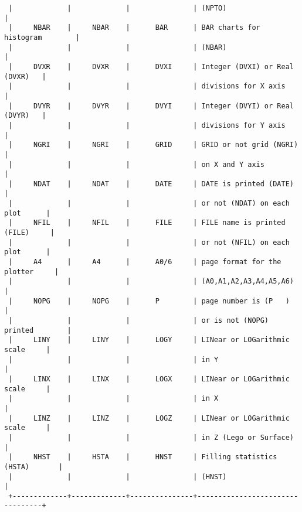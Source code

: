 \begin{verbatim}
 |             |             |               | (NPTO)                          |
 |     NBAR    |     NBAR    |      BAR      | BAR charts for histogram        |
 |             |             |               | (NBAR)                          |
 |     DVXR    |     DVXR    |      DVXI     | Integer (DVXI) or Real (DVXR)   |
 |             |             |               | divisions for X axis            |
 |     DVYR    |     DVYR    |      DVYI     | Integer (DVYI) or Real (DVYR)   |
 |             |             |               | divisions for Y axis            |
 |     NGRI    |     NGRI    |      GRID     | GRID or not grid (NGRI)         |
 |             |             |               | on X and Y axis                 |
 |     NDAT    |     NDAT    |      DATE     | DATE is printed (DATE)          |
 |             |             |               | or not (NDAT) on each plot      |
 |     NFIL    |     NFIL    |      FILE     | FILE name is printed (FILE)     |
 |             |             |               | or not (NFIL) on each plot      |
 |     A4      |     A4      |      A0/6     | page format for the plotter     |
 |             |             |               | (A0,A1,A2,A3,A4,A5,A6)          |
 |     NOPG    |     NOPG    |      P        | page number is (P   )           |
 |             |             |               | or is not (NOPG) printed        |
 |     LINY    |     LINY    |      LOGY     | LINear or LOGarithmic scale     |
 |             |             |               | in Y                            |
 |     LINX    |     LINX    |      LOGX     | LINear or LOGarithmic scale     |
 |             |             |               | in X                            |
 |     LINZ    |     LINZ    |      LOGZ     | LINear or LOGarithmic scale     |
 |             |             |               | in Z (Lego or Surface)          |
 |     NHST    |     HSTA    |      HNST     | Filling statistics (HSTA)       |
 |             |             |               | (HNST)                          |
 +-------------+-------------+---------------+---------------------------------+
\end{verbatim}
\ENDCMD


\BEGARG
{}
\ENDARG

